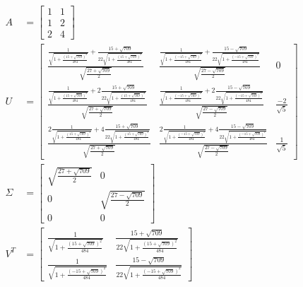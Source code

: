 \documentclass[a4paper, spanish]{article}
\begin{document}
    \begin{align}
      A &=
      \begin{bmatrix}
        1 & 1\\
        1 & 2\\
        2 & 4
      \end{bmatrix} \\
      U &=
      \begin{bmatrix}
        \frac{\frac{1}{\sqrt{1 + \frac{(15 + \sqrt{709})^2}{484}}} +
        \frac{15 + \sqrt{709}}{22\sqrt{1 + \frac{(15 + \sqrt{709})^2}{484}}}}{\sqrt{\frac{27 + \sqrt{709}}{2}}} & \frac{\frac{1}{\sqrt{1 + \frac{(- 15 + \sqrt{709})^2}{484}}} + \frac{15 - \sqrt{709}}{22\sqrt{1 + \frac{(- 15 + \sqrt{709})^2}{484}}}}{\sqrt{\frac{27 - \sqrt{709}}{2}}} & 0 \\
        \frac{\frac{1}{\sqrt{1 + \frac{(15 + \sqrt{709})^2}{484}}} +2
        \frac{15 + \sqrt{709}}{22\sqrt{1 + \frac{(15 + \sqrt{709})^2}{484}}}}{\sqrt{\frac{27 + \sqrt{709}}{2}}} & \frac{\frac{1}{\sqrt{1 + \frac{(- 15 + \sqrt{709})^2}{484}}} + 2
        \frac{15 - \sqrt{709}}{22\sqrt{1 + \frac{(- 15 + \sqrt{709})^2}{484}}}}{\sqrt{\frac{27 - \sqrt{709}}{2}}} & \frac{-2}{\sqrt{5}} \\
        \frac{2\frac{1}{\sqrt{1 + \frac{(15 + \sqrt{709})^2}{484}}} +4
        \frac{15 + \sqrt{709}}{22\sqrt{1 + \frac{(15 + \sqrt{709})^2}{484}}}}{\sqrt{\frac{27 + \sqrt{709}}{2}}} & \frac{2\frac{1}{\sqrt{1 + \frac{(- 15 + \sqrt{709})^2}{484}}} +4
        \frac{15 - \sqrt{709}}{22\sqrt{1 + \frac{(- 15 + \sqrt{709})^2}{484}}}}{\sqrt{\frac{27 - \sqrt{709}}{2}}} & \frac{1}{\sqrt{5}}
      \end{bmatrix} \\
      \Sigma &=
      \begin{bmatrix}
        \sqrt{\frac{27 + \sqrt{709}}{2}} & 0 \\
        0 & \sqrt{\frac{27 - \sqrt{709}}{2}} \\
        0 & 0
      \end{bmatrix} \\
      V^T &=
      \begin{bmatrix}
        \frac{1}{\sqrt{1 + \frac{(15 + \sqrt{709})^2}{484}}} &  \frac{15 + \sqrt{709}}{22\sqrt{1 + \frac{(15 + \sqrt{709})^2}{484}}}  \\
        \frac{1}{\sqrt{1 + \frac{(- 15 + \sqrt{709})^2}{484}}} & \frac{15 - \sqrt{709}}{22\sqrt{1 + \frac{(- 15 + \sqrt{709})^2}{484}}}
      \end{bmatrix}
    \end{align}
\end{document}
